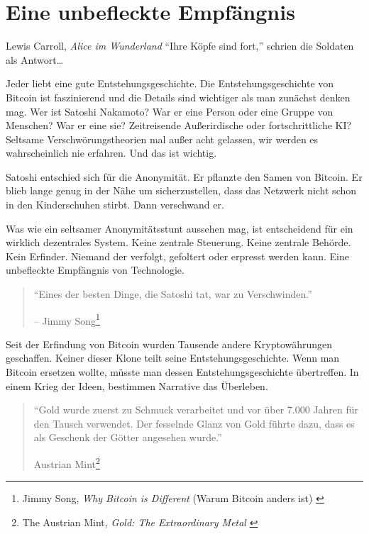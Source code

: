\chapter{Eine unbefleckte Empfängnis}
\label{les:5}

\begin{chapquote}{Lewis Carroll, \textit{Alice im Wunderland}}
\enquote{Ihre Köpfe sind fort,} schrien die Soldaten als Antwort\ldots
\end{chapquote}

Jeder liebt eine gute Entstehungsgeschichte. Die Entstehungsgeschichte von
Bitcoin ist faszinierend und die Details sind wichtiger als man zunächst denken
mag. Wer ist Satoshi Nakamoto? War er eine Person oder eine Gruppe von Menschen?
War er eine sie? Zeitreisende Außerirdische oder fortschrittliche KI? Seltsame
Verschwörungstheorien mal außer acht gelassen, wir werden es wahrscheinlich nie
erfahren. Und das ist wichtig.

Satoshi entschied sich für die Anonymität. Er pflanzte den Samen von Bitcoin. Er
blieb lange genug in der Nähe um sicherzustellen, dass das Netzwerk nicht schon
in den Kinderschuhen stirbt. Dann verschwand er.

Was wie ein seltsamer Anonymitätsstunt aussehen mag, ist entscheidend für ein
wirklich dezentrales System. Keine zentrale Steuerung. Keine zentrale Behörde.
Kein Erfinder. Niemand der verfolgt, gefoltert oder erpresst werden kann. Eine
unbefleckte Empfängnis von Technologie.

\begin{quotation}\begin{samepage}
\enquote{Eines der besten Dinge, die Satoshi tat, war zu Verschwinden.}
\begin{flushright} -- Jimmy Song\footnote{Jimmy Song, \textit{Why Bitcoin is Different} (Warum Bitcoin anders ist) \cite{bitcoin-different}}
\end{flushright}\end{samepage}\end{quotation}

\newpage

Seit der Erfindung von Bitcoin wurden Tausende andere Kryptowährungen
geschaffen. Keiner dieser Klone teilt seine Entstehungsgeschichte. Wenn man
Bitcoin ersetzen wollte, müsste man dessen Entstehungsgeschichte übertreffen. In
einem Krieg der Ideen, bestimmen Narrative das Überleben.

\begin{quotation}\begin{samepage}
\enquote{Gold wurde zuerst zu Schmuck verarbeitet und vor über 7.000 Jahren für
den Tausch verwendet. Der fesselnde Glanz von Gold führte dazu, dass es als
Geschenk der Götter angesehen wurde.}
\begin{flushright} Austrian Mint\footnote{The Austrian Mint, \textit{Gold: The Extraordinary Metal} \cite{gold-gift-gods}}
\end{flushright}\end{samepage}\end{quotation}

